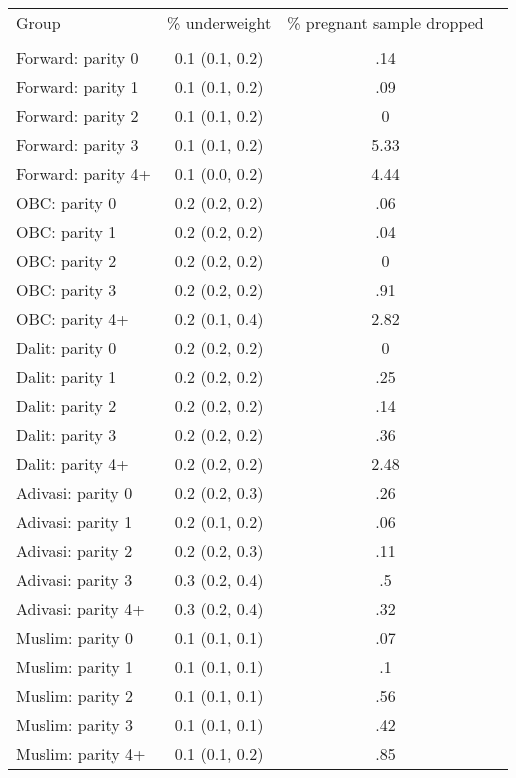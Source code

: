 \begin{tabular}{lccc}
\toprule
Group & \% underweight & \% pregnant sample dropped \\\\
\midrule
Forward: parity 0&0.1 (0.1, 0.2)&.14\\
Forward: parity 1&0.1 (0.1, 0.2)&.09\\
Forward: parity 2&0.1 (0.1, 0.2)&0\\
Forward: parity 3&0.1 (0.1, 0.2)&5.33\\
Forward: parity 4+&0.1 (0.0, 0.2)&4.44\\
OBC: parity 0&0.2 (0.2, 0.2)&.06\\
OBC: parity 1&0.2 (0.2, 0.2)&.04\\
OBC: parity 2&0.2 (0.2, 0.2)&0\\
OBC: parity 3&0.2 (0.2, 0.2)&.91\\
OBC: parity 4+&0.2 (0.1, 0.4)&2.82\\
Dalit: parity 0&0.2 (0.2, 0.2)&0\\
Dalit: parity 1&0.2 (0.2, 0.2)&.25\\
Dalit: parity 2&0.2 (0.2, 0.2)&.14\\
Dalit: parity 3&0.2 (0.2, 0.2)&.36\\
Dalit: parity 4+&0.2 (0.2, 0.2)&2.48\\
Adivasi: parity 0&0.2 (0.2, 0.3)&.26\\
Adivasi: parity 1&0.2 (0.1, 0.2)&.06\\
Adivasi: parity 2&0.2 (0.2, 0.3)&.11\\
Adivasi: parity 3&0.3 (0.2, 0.4)&.5\\
Adivasi: parity 4+&0.3 (0.2, 0.4)&.32\\
Muslim: parity 0&0.1 (0.1, 0.1)&.07\\
Muslim: parity 1&0.1 (0.1, 0.1)&.1\\
Muslim: parity 2&0.1 (0.1, 0.1)&.56\\
Muslim: parity 3&0.1 (0.1, 0.1)&.42\\
Muslim: parity 4+&0.1 (0.1, 0.2)&.85\\
\bottomrule
\end{tabular}
